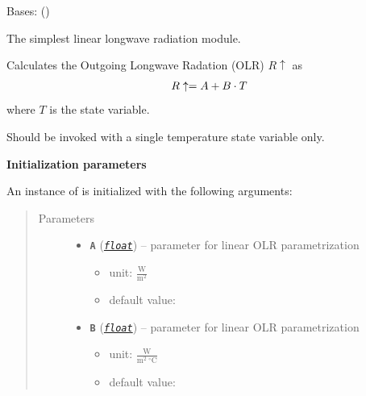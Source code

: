 \documentclass[a4paper,10pt,english]{sphinxmanual}
\begin{document}
\begin{fulllineitems}
\label{api/climlab.radiation:climlab.radiation.AplusBT.AplusBT}
Bases: {\hyperref[api/climlab.process:climlab.process.energy_budget.EnergyBudget]{\emph{}}} ()

The simplest linear longwave radiation module.

Calculates the Outgoing Longwave Radation (OLR) \(R\uparrow\) as
\begin{gather}
\begin{split}R\uparrow = A + B \cdot T\end{split}\notag
\end{gather}
where \(T\) is the state variable.

Should be invoked with a single temperature state variable only.

\textbf{Initialization parameters}

An instance of  is initialized with the following 
arguments:
\begin{quote}\begin{description}
\item[{Parameters}] \leavevmode\begin{itemize}
\item {} 
\textbf{\texttt{A}} (\href{http://docs.python.org/2.7/library/functions.html\#float}{\emph{\texttt{float}}}) -- 
parameter for linear OLR parametrization
\begin{itemize}
\item {} 
unit: \(\frac{\textrm{W}}
{\textrm{m}^2}\)

\item {} 
default value: 

\end{itemize}


\item {} 
\textbf{\texttt{B}} (\href{http://docs.python.org/2.7/library/functions.html\#float}{\emph{\texttt{float}}}) -- 
parameter for linear OLR parametrization
\begin{itemize}
\item {} 
unit: \(\frac{\textrm{W}}
{\textrm{m}^2 \ ^{\circ} \textrm{C}}\)

\item {} 
default value: 


\end{itemize}
\end{itemize}
\end{description}
\end{quote}
\end{fulllineitems}
\end{document}
